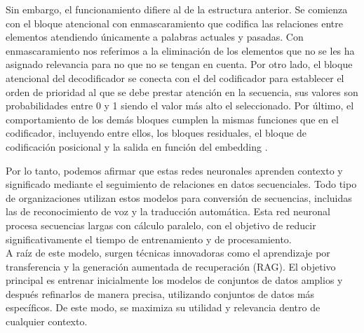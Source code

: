 \begin{itemize}
	Sin embargo, el funcionamiento difiere al de la estructura anterior. Se comienza con el bloque atencional con enmascaramiento que codifica las relaciones entre elementos atendiendo únicamente a palabras actuales y pasadas. Con enmascaramiento nos referimos a la eliminación de los elementos que no se les ha asignado relevancia para no que no se tengan en cuenta. Por otro lado, el bloque atencional del decodificador se conecta con el del codificador para establecer el orden de prioridad al que se debe prestar atención en la secuencia, sus valores son probabilidades entre 0 y 1 siendo el valor más alto el seleccionado. Por último, el comportamiento de los demás bloques cumplen la mismas funciones que en el codificador, incluyendo entre ellos, los bloques residuales, el bloque de codificación posicional y la salida en función del embedding \citep{transformers}.  \\
	
\end{itemize}


Por lo tanto, podemos afirmar que estas redes neuronales aprenden contexto y significado mediante el seguimiento de relaciones en datos secuenciales. Todo tipo de organizaciones utilizan estos modelos para conversión de secuencias, incluidas las de reconocimiento de voz y la traducción automática. Esta red neuronal procesa secuencias largas con cálculo paralelo, con el objetivo de reducir significativamente el tiempo de entrenamiento y de procesamiento.\\

A raíz de este modelo, surgen técnicas innovadoras como el aprendizaje por transferencia y la generación aumentada de recuperación (RAG). El objetivo principal es entrenar inicialmente los modelos de conjuntos de datos amplios y después refinarlos de manera precisa, utilizando conjuntos de datos más específicos. De este modo, se maximiza su utilidad y relevancia dentro de cualquier contexto.\\

